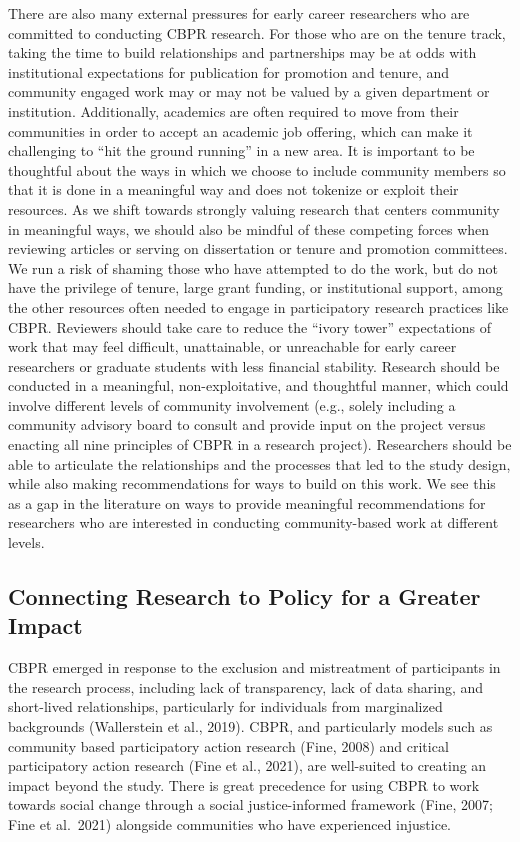 \documentclass[
  11pt,
]{book}
\begin{document}
There are also many external pressures for early career researchers who are committed to conducting CBPR research. For those who are on the tenure track, taking the time to build relationships and partnerships may be at odds with institutional expectations for publication for promotion and tenure, and community engaged work may or may not be valued by a given department or institution. Additionally, academics are often required to move from their communities in order to accept an academic job offering, which can make it challenging to ``hit the ground running'' in a new area. It is important to be thoughtful about the ways in which we choose to include community members so that it is done in a meaningful way and does not tokenize or exploit their resources. As we shift towards strongly valuing research that centers community in meaningful ways, we should also be mindful of these competing forces when reviewing articles or serving on dissertation or tenure and promotion committees. We run a risk of shaming those who have attempted to do the work, but do not have the privilege of tenure, large grant funding, or institutional support, among the other resources often needed to engage in participatory research practices like CBPR. Reviewers should take care to reduce the ``ivory tower'' expectations of work that may feel difficult, unattainable, or unreachable for early career researchers or graduate students with less financial stability. Research should be conducted in a meaningful, non-exploitative, and thoughtful manner, which could involve different levels of community involvement (e.g., solely including a community advisory board to consult and provide input on the project versus enacting all nine principles of CBPR in a research project). Researchers should be able to articulate the relationships and the processes that led to the study design, while also making recommendations for ways to build on this work. We see this as a gap in the literature on ways to provide meaningful recommendations for researchers who are interested in conducting community-based work at different levels.

\hypertarget{connecting-research-to-policy-for-a-greater-impact}{%
\subsection{Connecting Research to Policy for a Greater Impact}\label{connecting-research-to-policy-for-a-greater-impact}}

CBPR emerged in response to the exclusion and mistreatment of participants in the research process, including lack of transparency, lack of data sharing, and short-lived relationships, particularly for individuals from marginalized backgrounds (Wallerstein et al., 2019). CBPR, and particularly models such as community based participatory action research (Fine, 2008) and critical participatory action research (Fine et al., 2021), are well-suited to creating an impact beyond the study. There is great precedence for using CBPR to work towards social change through a social justice-informed framework (Fine, 2007; Fine et al.~2021) alongside communities who have experienced injustice.
\end{document}
